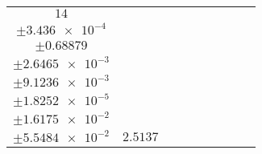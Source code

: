 \documentclass[8pt]{article}
\begin{document}
\begin{longtable}[l]{c c c c c c c c c}
$\num{14}$ & \begin{tabular}[c]{@{}c@{}}$\num{2.942e-2}$ \\ $\pm\num{3.436e-4}$\end{tabular} & \begin{tabular}[c]{@{}c@{}}$\num{0.30809}$ \\ $\pm\num{0.68879}$\end{tabular} & \begin{tabular}[c]{@{}c@{}}$\num{7.5568}$ \\ $\pm\num{2.6465e-3}$\end{tabular} & \begin{tabular}[c]{@{}c@{}}$\num{2.151e+3}$ \\ $\pm\num{9.1236e-3}$\end{tabular} & \begin{tabular}[c]{@{}c@{}}$\num{4.3031}$ \\ $\pm\num{1.8252e-5}$\end{tabular} & \begin{tabular}[c]{@{}c@{}}$\num{1.1405}$ \\ $\pm\num{1.6175e-2}$\end{tabular} & \begin{tabular}[c]{@{}c@{}}$\num{4.1361}$ \\ $\pm\num{5.5484e-2}$\end{tabular} & $\num{2.5137}$\\
\bottomrule
\end{longtable}
\end{document}

